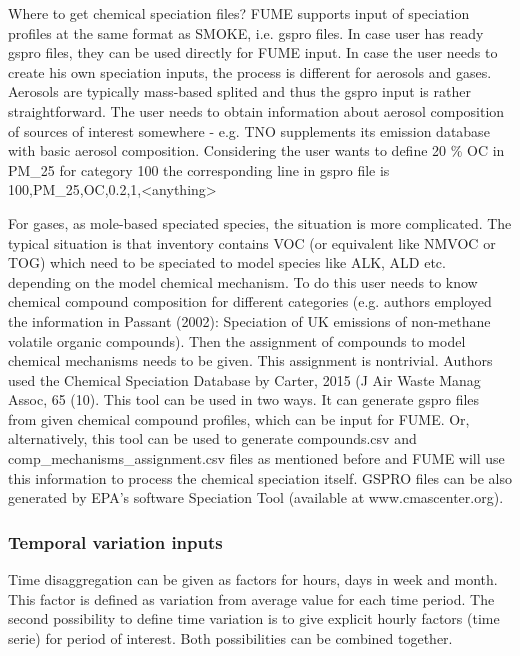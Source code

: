 \documentclass[a4paper,11pt]{article}
\begin{document}
Where to get chemical speciation files? FUME supports input of
speciation profiles at the same format as SMOKE, i.e. gspro files. In
case user has ready gspro files, they can be used directly for FUME
input. In case the user needs to create his own speciation inputs, the
process is different for aerosols and gases. Aerosols are typically
mass-based splited and thus the gspro input is rather straightforward.
The user needs to obtain information about aerosol composition of
sources of interest somewhere - e.g. TNO supplements its emission
database with basic aerosol composition. Considering the user wants to
define 20 \% OC in PM\_25 for category 100 the corresponding line in
gspro file is 100,PM\_25,OC,0.2,1,\textless{}anything\textgreater{}

For gases, as mole-based speciated species, the situation is more
complicated. The typical situation is that inventory contains VOC (or
equivalent like NMVOC or TOG) which need to be speciated to model
species like ALK, ALD etc. depending on the model chemical mechanism. To
do this user needs to know chemical compound composition for different
categories (e.g. authors employed the information in Passant (2002):
Speciation of UK emissions of non-methane volatile organic compounds).
Then the assignment of compounds to model chemical mechanisms needs to
be given. This assignment is nontrivial. Authors used the Chemical
Speciation Database by Carter, 2015 (J Air Waste Manag Assoc, 65 (10).
This tool can be used in two ways. It can generate gspro files from
given chemical compound profiles, which can be input for FUME. Or,
alternatively, this tool can be used to generate compounds.csv and
comp\_mechanisms\_assignment.csv files as mentioned before and FUME will
use this information to process the chemical speciation itself. GSPRO
files can be also generated by EPA's software Speciation Tool (available
at www.cmascenter.org).

\subsubsection{Temporal variation inputs}\label{temporal-variation-inputs}

Time disaggregation can be given as factors for hours, days in week and
month. This factor is defined as variation from average value for each
time period. The second possibility to define time variation is to give
explicit hourly factors (time serie) for period of interest. Both
possibilities can be combined together.
\end{document}
